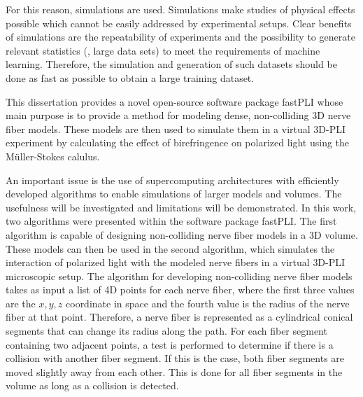 \par
% 
For this reason, simulations are used.
Simulations make studies of physical effects possible which cannot be easily addressed by experimental setups.
Clear benefits of simulations are the repeatability of experiments and the possibility to generate relevant statistics (\ie{}, large data sets) to meet \eg{} the requirements of machine learning.
Therefore, the simulation and generation of such datasets should be done as fast as possible to obtain a large training dataset. \\
\cite{Ginsburger2018, ginsburgerDis2019, Callaghan2019, Menzel2020}
\par
%
This dissertation provides a novel open-source software package \ac{fastPLI} whose main purpose is to provide a method for modeling dense, non-colliding 3D nerve fiber models.
These models are then used to simulate them in a virtual \ac{3D-PLI} experiment by calculating the effect of birefringence on polarized light using the M{\"u}ller-Stokes calulus. \\
\cite{Matuschke2019, Matuschke2021, Reuter2019}
\par
% 
An important issue is the use of supercomputing architectures with efficiently developed algorithms to enable simulations of larger models and volumes.
The usefulness will be investigated and limitations will be demonstrated.
% 
% 
% 
In this work, two algorithms were presented within the software package \ac{fastPLI}.
The first algorithm is capable of designing non-colliding nerve fiber models in a 3D volume.
These models can then be used in the second algorithm, which simulates the interaction of polarized light with the modeled nerve fibers in a virtual \ac{3D-PLI} microscopic setup.
% 
% 
% 
% 
The algorithm for developing non-colliding nerve fiber models takes as input a list of 4D points for each nerve fiber, where the first three values are the $x,y,z$ coordinate in space and the fourth value is the radius of the nerve fiber at that point.
Therefore, a nerve fiber is represented as a cylindrical conical segments that can change its radius along the path.
For each fiber segment containing two adjacent points, a test is performed to determine if there is a collision with another fiber segment.
If this is the case, both fiber segments are moved slightly away from each other.
This is done for all fiber segments in the volume as long as a collision is detected.
